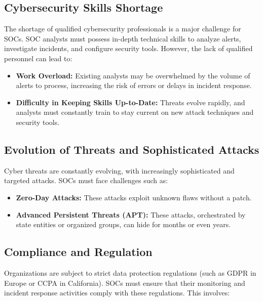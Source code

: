 \subsection{Cybersecurity Skills Shortage}
\label{subsec:skills-shortage}

The shortage of qualified cybersecurity professionals is a major challenge for SOCs. SOC analysts must possess in-depth technical skills to analyze alerts, investigate incidents, and configure security tools. However, the lack of qualified personnel can lead to:

\begin{itemize}
    \item \textbf{Work Overload:} Existing analysts may be overwhelmed by the volume of alerts to process, increasing the risk of errors or delays in incident response.
    \item \textbf{Difficulty in Keeping Skills Up-to-Date:} Threats evolve rapidly, and analysts must constantly train to stay current on new attack techniques and security tools.
\end{itemize}

\subsection{Evolution of Threats and Sophisticated Attacks}
\label{subsec:evolved-threats}

Cyber threats are constantly evolving, with increasingly sophisticated and targeted attacks. SOCs must face challenges such as:

\begin{itemize}
    \item \textbf{Zero-Day Attacks:} These attacks exploit unknown flaws without a patch.
    \item \textbf{Advanced Persistent Threats (APT):} These attacks, orchestrated by state entities or organized groups, can hide for months or even years.
\end{itemize}

\subsection{Compliance and Regulation}
\label{subsec:compliance}

Organizations are subject to strict data protection regulations (such as GDPR in Europe or CCPA in California). SOCs must ensure that their monitoring and incident response activities comply with these regulations. This involves:

